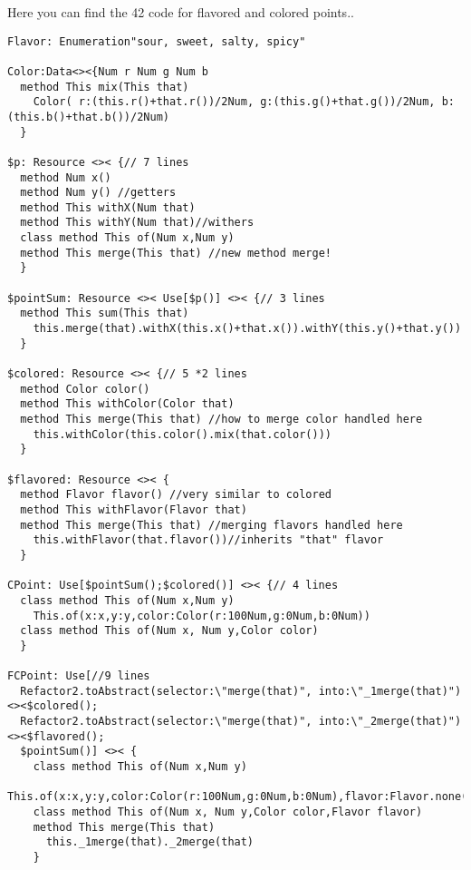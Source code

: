 Here you can find the 42 code for flavored and colored points..

\begin{lstlisting}[basicstyle=\tiny, mathescape=false]
Flavor: Enumeration"sour, sweet, salty, spicy"

Color:Data<><{Num r Num g Num b
  method This mix(This that)
    Color( r:(this.r()+that.r())/2Num, g:(this.g()+that.g())/2Num, b:(this.b()+that.b())/2Num)
  }

$p: Resource <>< {// 7 lines
  method Num x()
  method Num y() //getters
  method This withX(Num that)
  method This withY(Num that)//withers
  class method This of(Num x,Num y)
  method This merge(This that) //new method merge!
  }

$pointSum: Resource <>< Use[$p()] <>< {// 3 lines
  method This sum(This that)
    this.merge(that).withX(this.x()+that.x()).withY(this.y()+that.y())
  }

$colored: Resource <>< {// 5 *2 lines
  method Color color()
  method This withColor(Color that)
  method This merge(This that) //how to merge color handled here
    this.withColor(this.color().mix(that.color()))
  }

$flavored: Resource <>< {
  method Flavor flavor() //very similar to colored
  method This withFlavor(Flavor that)
  method This merge(This that) //merging flavors handled here
    this.withFlavor(that.flavor())//inherits "that" flavor
  }

CPoint: Use[$pointSum();$colored()] <>< {// 4 lines
  class method This of(Num x,Num y)
    This.of(x:x,y:y,color:Color(r:100Num,g:0Num,b:0Num))
  class method This of(Num x, Num y,Color color)
  }

FCPoint: Use[//9 lines
  Refactor2.toAbstract(selector:\"merge(that)", into:\"_1merge(that)")<><$colored();
  Refactor2.toAbstract(selector:\"merge(that)", into:\"_2merge(that)")<><$flavored();
  $pointSum()] <>< {
    class method This of(Num x,Num y)
      This.of(x:x,y:y,color:Color(r:100Num,g:0Num,b:0Num),flavor:Flavor.none())
    class method This of(Num x, Num y,Color color,Flavor flavor)
    method This merge(This that)
      this._1merge(that)._2merge(that)
    }
\end{lstlisting}

